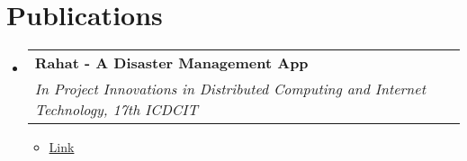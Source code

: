 \documentclass[letterpaper,11pt]{article}
\makeatletter
\newcommand{\resumeItem}[1]{
  \item\small{
    {#1 \vspace{-2pt}}
  }
}
\newcommand{\resumeSubheading}[4]{
  \vspace{-2pt}\item
    \begin{tabular*}{0.97\textwidth}[t]{l@{\extracolsep{\fill}}r}
      \textbf{#1} & #2 \\
      \textit{\small#3} & \textit{\small #4} \\
    \end{tabular*}\vspace{-7pt}
}
\newcommand{\resumeSubHeadingListStart}{\begin{itemize}[leftmargin=0.15in, label={}]}
\newcommand{\resumeSubHeadingListEnd}{\end{itemize}}
\newcommand{\resumeItemListStart}{\begin{itemize}}
\newcommand{\resumeItemListEnd}{\end{itemize}\vspace{-5pt}}
\makeatother
\begin{document}
\section{Publications}
  \resumeSubHeadingListStart
    \resumeSubheading
      {Rahat - A Disaster Management App}{}
      {In Project Innovations in Distributed Computing and Internet Technology, 17th ICDCIT}{}
      \resumeItemListStart
      \resumeItem{\href{https://drive.google.com/file/d/16IL_54gRIlrMemAvtV0bdY24hkztj0pV/view}{Link}}
      \resumeItemListEnd
  \resumeSubHeadingListEnd

%


\end{document}
